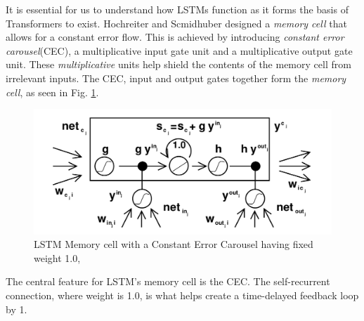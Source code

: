 \documentclass[a4paper,12pt]{report}
\begin{document}
            It is essential for us to understand how LSTMs function as it forms the basis of Transformers to exist. Hochreiter and Scmidhuber designed a \textit{memory cell} that  allows for a constant error flow. This is achieved by introducing \textit{constant error carousel}(CEC), a multiplicative input gate unit and a multiplicative output gate unit. These \textit{multiplicative} units help shield the contents of the memory cell from irrelevant inputs. The CEC, input and output gates together form the \textit{memory cell}, as seen in Fig. \ref{lstmCEC}.
           	\begin{figure}[h!]
      				\includegraphics[scale=0.35]{../images/lstm-memorycell.png}
      				\caption{LSTM Memory cell with a Constant Error Carousel having fixed weight 1.0, \citep{lstmoriginal}}\label{lstmCEC}
             \end{figure}
            The central feature for LSTM's memory cell is the CEC. The self-recurrent connection, where weight is 1.0, is what helps create a time-delayed feedback loop by 1.
\end{document}
